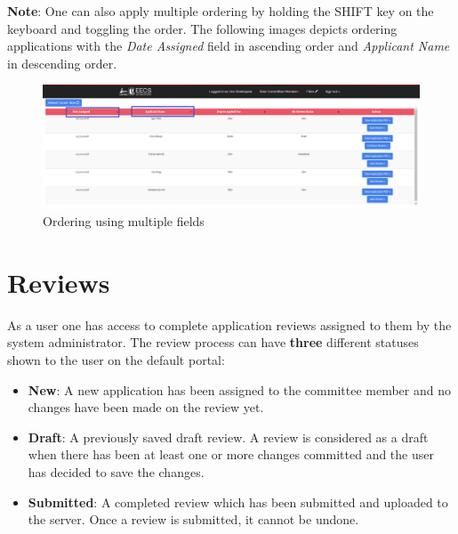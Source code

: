 \documentclass[fontsize=12pt,paper=letter,twoside]{scrartcl}
\begin{document}
\newpage
\bigskip
\noindent \textbf{Note}: One can also apply multiple ordering by holding the SHIFT key on the keyboard and toggling the order. The following images depicts ordering applications with the \emph{Date Assigned} field in ascending order and \emph{Applicant Name} in descending order.

\begin{figure}[!htb]
\begin{center}
\includegraphics[width=.9\textwidth]{images/multiple_order.png}
\end{center}
\caption{Ordering using multiple fields}
\label{fig:multiple_order}
\end{figure}

\clearpage
\newpage
\section{Reviews} \label{sec:reviews}
As a user one has access to complete application reviews assigned to them by the system administrator. The review process can have \textbf{three} different statuses shown to the user on the default portal:
\begin{itemize}
\item \textbf{New}: A new application has been assigned to the committee member and no changes have been made on the review yet.
\item \textbf{Draft}: A previously saved draft review. A review is considered as a draft when there has been at least one or more changes committed and the user has decided to save the changes.
\item \textbf{Submitted}: A completed review which has been submitted and uploaded to the server. Once a review is submitted, it cannot be undone.
\end{itemize}
\end{document}
